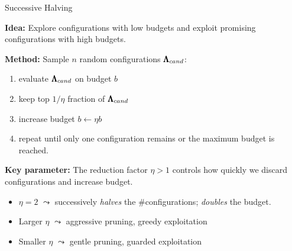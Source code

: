\documentclass[main]{subfiles}
\begin{document}
\begin{frame}{Successive Halving}

\textbf{Idea:} Explore configurations with low budgets and exploit promising configurations with high budgets.

\vspace{0.2cm}

\textbf{Method:} Sample $n$ random configurations $\pmb{\Lambda}_{cand}$: 
\begin{enumerate}
    \item evaluate $\pmb{\Lambda}_{cand}$ on budget $b$
    \item keep top $1/\eta$ fraction of $\pmb{\Lambda}_{cand}$
    \item increase budget $b \leftarrow \eta b$
    \item repeat until only one configuration remains or the maximum budget is reached.
\end{enumerate}

\vspace{0.2cm}

\textbf{Key parameter:} The reduction factor $\eta > 1$ controls how quickly we discard configurations and increase budget.
\begin{itemize}
    \item $\eta=2$ $\leadsto$ successively \emph{halves} the \#configurations; \emph{doubles} the budget.
    \item Larger $\eta$ $\leadsto$ aggressive pruning, greedy exploitation
    \item Smaller $\eta$ $\leadsto$ gentle pruning, guarded exploitation
\end{itemize}
\end{frame}
\end{document}
